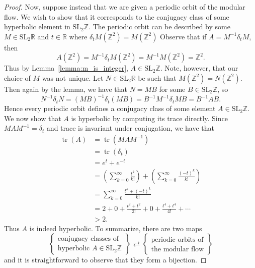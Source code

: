 \documentclass[12pt,twoside]{reedthesis}
\theoremstyle{definition}
\newcommand{\Z}{\mathbb{Z}}
\newcommand{\R}{\mathbb{R}}
\newcommand{\SLZ}{\mathrm{SL}_2{\Z}}
\newcommand{\SLR}{\mathrm{SL}_2{\R}}
\DeclareMathOperator{\tr}{tr}
\begin{document}
\begin{proof}
  Now, suppose instead that we are given a periodic orbit of the modular flow.
  We wish to show that it corresponds to the conjugacy class of some hyperbolic element in $\SLZ$.
  The periodic orbit can be described by some $M \in \SLR$ and $t \in \R$ where $\delta_t M(\Z^2) = M(\Z^2)$
  Observe that if $A = M^{-1} \delta_t M$, then
  \begin{equation*}
    A(\Z^2) = M^{-1} \delta_t M (\Z^2) = M^{-1} M (\Z^2) = \Z^2.
  \end{equation*}
  Thus by Lemma~\ref{lemma:m_is_integer}, $A \in \SLZ$.
  Note, however, that our choice of $M$ was not unique.
  Let $N \in \SLR$ be such that $M(\Z^2) = N(\Z^2)$.
  Then again by the lemma, we have that $N = MB$ for some $B \in \SLZ$, so
  \begin{equation*}
    N^{-1} \delta_t N = (MB)^{-1} \delta_t (MB) = B^{-1} M^{-1} \delta_t M B = B^{-1} A B.
  \end{equation*}
  Hence every periodic orbit defines a conjugacy class of some element $A \in \SLZ$.
  We now show that $A$ is hyperbolic by computing its trace directly.
  Since $MAM^{-1} = \delta_t$ and trace is invariant under conjugation, we have that 
  \begin{align*}
    \tr(A) &= \tr(MAM^{-1}) \\
    &= \tr(\delta_t) \\
    &= e^{t} + e^{-t} \\
    &= \left( \sum_{k=0}^\infty \frac{t^k}{k!} \right) + \left( \sum_{k=0}^\infty \frac{(-t)^k}{k!} \right) \\[0.5em]
    &= \sum_{k=0}^\infty \frac{t^k + (-t)^k}{k!} \\[0.5em]
    &= 2 + 0 + \frac{t^2 + t^2}{2!} + 0 + \frac{t^4 + t^4}{4!} + \cdots \\
    &> 2.
  \end{align*}
  Thus $A$ is indeed hyperbolic. To summarize, there are two maps
  \begin{equation*}
    \left\lbrace
    \begin{array}{c}
      \text{conjugacy classes of} \\
      \text{hyperbolic } A \in \SLZ
    \end{array}
    \right\rbrace \rightleftarrows \left\lbrace
    \begin{array}{c}
      \text{periodic orbits of} \\
      \text{the modular flow}
    \end{array}
    \right\rbrace
  \end{equation*}
  and it is straightforward to observe that they form a bijection.
\end{proof}
\end{document}
